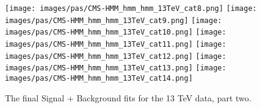 \begin{figure}[h!]
    \centering
    \texttt{[image: images/pas/CMS-HMM\_hmm\_hmm\_13TeV\_cat8.png]}
    \texttt{[image: images/pas/CMS-HMM\_hmm\_hmm\_13TeV\_cat9.png]}
    \texttt{[image: images/pas/CMS-HMM\_hmm\_hmm\_13TeV\_cat10.png]}
    \texttt{[image: images/pas/CMS-HMM\_hmm\_hmm\_13TeV\_cat11.png]}
    \texttt{[image: images/pas/CMS-HMM\_hmm\_hmm\_13TeV\_cat12.png]}
    \texttt{[image: images/pas/CMS-HMM\_hmm\_hmm\_13TeV\_cat13.png]}
    \texttt{[image: images/pas/CMS-HMM\_hmm\_hmm\_13TeV\_cat14.png]}
    \caption[More signal + background fits for the individual categories on 13 TeV data.]
    {The final Signal + Background fits for the 13 TeV data, part two.}
    \label{fig:fitsbycat2}
\end{figure}
\clearpage
